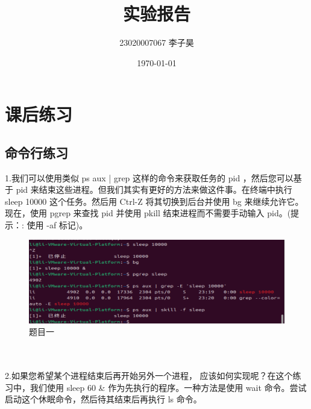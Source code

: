 \documentclass[a4paper, 12pt]{article}
\title{实验报告}
\author{23020007067 李子昊}
\date{\today}
\begin{document}
\maketitle
{}
\large \tableofcontents
\newpage
{}
\section{课后练习}
\subsection{命令行练习}
\noindent 1.我们可以使用类似 ps aux | grep 这样的命令来获取任务的 pid ，然后您可以基于 pid 来结束这些进程。但我们其实有更好的方法来做这件事。在终端中执行 sleep 10000 这个任务。然后用 Ctrl-Z 将其切换到后台并使用 bg 来继续允许它。现在，使用 pgrep 来查找 pid 并使用 pkill 结束进程而不需要手动输入 pid。(提示：: 使用 -af 标记)。

\begin{figure}[H]
  \centering
  \includegraphics[width=1\textwidth]{屏幕截图 2024-09-12 232133.png}
  \caption{题目一}
    \end{figure}
\\
\\
\noindent 2.如果您希望某个进程结束后再开始另外一个进程， 应该如何实现呢？在这个练习中，我们使用 sleep 60 & 作为先执行的程序。一种方法是使用 wait 命令。尝试启动这个休眠命令，然后待其结束后再执行 ls 命令。
\end{document}
